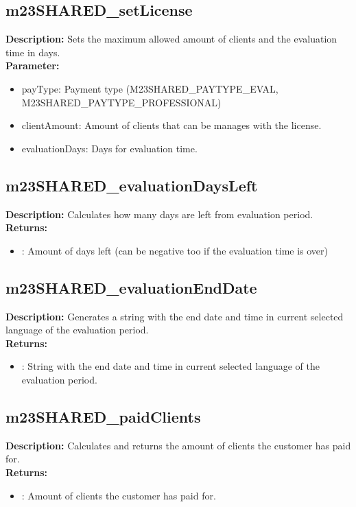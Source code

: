 \subsection{m23SHARED\_setLicense}
\textbf{Description:} Sets the maximum allowed amount of clients and the evaluation time in days.\\
\textbf{Parameter:}
\begin{itemize}
\item payType: Payment type (M23SHARED\_PAYTYPE\_EVAL, M23SHARED\_PAYTYPE\_PROFESSIONAL)
\item clientAmount: Amount of clients that can be manages with the license.
\item evaluationDays: Days for evaluation time.
\end{itemize}

\subsection{m23SHARED\_evaluationDaysLeft}
\textbf{Description:} Calculates how many days are left from evaluation period.\\
\textbf{Returns:}
\begin{itemize}
\item : Amount of days left (can be negative too if the evaluation time is over)
\end{itemize}

\subsection{m23SHARED\_evaluationEndDate}
\textbf{Description:} Generates a string with the end date and time in current selected language of the evaluation period.\\
\textbf{Returns:}
\begin{itemize}
\item : String with the end date and time in current selected language of the evaluation period.
\end{itemize}

\subsection{m23SHARED\_paidClients}
\textbf{Description:} Calculates and returns the amount of clients the customer has paid for.\\
\textbf{Returns:}
\begin{itemize}
\item : Amount of clients the customer has paid for.
\end{itemize}

